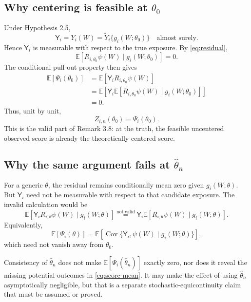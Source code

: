 \documentclass[11pt]{article}
\newcommand{\E}{\mathbb E}
\begin{document}
\subsection{Why centering is feasible at \(\theta_0\)}

Under Hypothesis 2.5,
\[
 \mathsf{Y}_i=Y_i(W)
 =\widetilde Y_i\{g_i(W;\theta_0)\}
 \quad\text{almost surely}.
\]
Hence \(\mathsf{Y}_i\) is measurable with respect to the true exposure. By
\eqref{eq:residual},
\[
 \E[R_{i,\theta_0}\psi(W)\mid g_i(W;\theta_0)]=0.
\]
The conditional pull-out property then gives
\begin{align}
 \E[\Psi_i(\theta_0)]
 &=\E[\mathsf{Y}_iR_{i,\theta_0}\psi(W)] \\
 &=\E\!\left[
   \mathsf{Y}_i
   \E[R_{i,\theta_0}\psi(W)\mid g_i(W;\theta_0)]
 \right] \\
 &=0.
 \label{eq:truth-zero}
\end{align}
Thus, unit by unit,
\begin{equation}
 Z_{i,n}(\theta_0)=\Psi_i(\theta_0).
 \label{eq:truth-equality}
\end{equation}
This is the valid part of Remark 3.8: at the truth, the feasible uncentered
observed score is already the theoretically centered score.

\subsection{Why the same argument fails at \(\widehat\theta_n\)}

For a generic \(\theta\), the residual remains conditionally mean zero given
\(g_i(W;\theta)\). But \(\mathsf{Y}_i\) need not be measurable with respect to
that candidate exposure. The invalid calculation would be
\[
 \E[\mathsf{Y}_iR_{i,\theta}\psi(W)\mid g_i(W;\theta)]
 \stackrel{\mathrm{not\ valid}}{=}
 \mathsf{Y}_i
 \E[R_{i,\theta}\psi(W)\mid g_i(W;\theta)].
\]
Equivalently,
\begin{equation}
 \E[\Psi_i(\theta)]
 =\E\!\left[
   \operatorname{Cov}\{\mathsf{Y}_i,\psi(W)\mid g_i(W;\theta)\}
 \right],
 \label{eq:off-truth-covariance}
\end{equation}
which need not vanish away from \(\theta_0\).

Consistency of \(\widehat\theta_n\) does not make
\(\E[\Psi_i(\widehat\theta_n)]\) exactly zero, nor does it reveal the missing
potential outcomes in \eqref{eq:score-mean}. It may make the effect of using
\(\widehat\theta_n\) asymptotically negligible, but that is a separate
stochastic-equicontinuity claim that must be assumed or proved.
\end{document}
